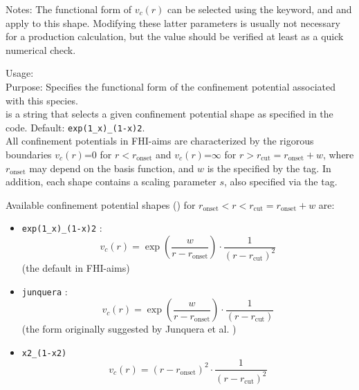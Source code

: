 Notes: The functional form of $v_c(r)$ can be selected using the
 keyword, and 
and  apply to this shape. Modifying these latter
parameters is usually not necessary for a production calculation, but
the  value should be verified at least as a quick
numerical check.

{
  \noindent
  Usage:   \\[1.0ex]
  Purpose: Specifies the functional form of the confinement potential
    associated with this species. \\[1.0ex]
   is a string that selects a given confinement
    potential shape as specified in the code. Default: \texttt{exp(1\_x)\_(1-x)2}. \\
}
All confinement potentials in FHI-aims are characterized by the rigorous
boundaries $v_c(r)$=0 for $r<r_\text{onset}$ and $v_c(r)$=$\infty$ for
$r>r_\text{cut} = r_\text{onset}+w$, where $r_\text{onset}$ may depend on the basis
function, and $w$ is the  specified by the
   tag. In addition, each shape contains
  a scaling parameter $s$, also specified via the
   tag. 

Available confinement potential shapes () for
$r_\text{onset}<r< r_\text{cut} = r_\text{onset}+w$ are:
\begin{itemize}
  \item \texttt{exp(1\_x)\_(1-x)2} : 
    \[
       v_c(r) = \exp(\frac{w}{r-r_\text{onset}}) \cdot \frac{1}{(r-r_\text{cut})^2} 
    \]
    (the default in FHI-aims)
  \item \texttt{junquera} : 
    \[
       v_c(r) = \exp(\frac{w}{r-r_\text{onset}}) \cdot \frac{1}{(r-r_\text{cut})} 
    \]
    (the form originally suggested by Junquera et al. \cite{Junquera01})
  \item \texttt{x2\_(1-x2)}
    \[
       v_c(r) = (r-r_\text{onset})^2 \cdot \frac{1}{(r-r_\text{cut})^2} 
    \]
\end{itemize}


